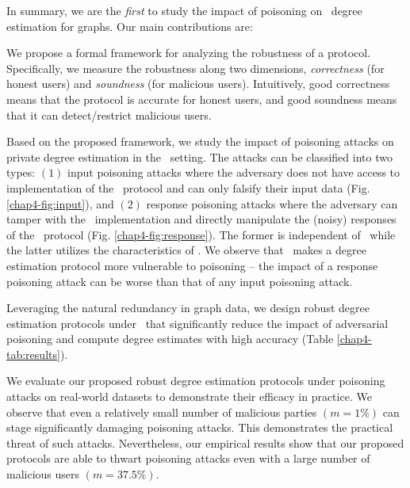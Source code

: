 In summary, we are the \textit{first} to study the impact of poisoning  on \ldp~degree estimation for graphs. Our main contributions are: 
\squishlist
    \item We propose a formal framework for analyzing the robustness of a protocol. %
Specifically, we measure the robustness along two dimensions, \textit{correctness} (for honest users) and \textit{soundness} (for malicious users). Intuitively, good correctness means that the protocol is accurate for honest users, and good soundness means that it can detect/restrict malicious users. %
\item Based on the proposed framework, we study the impact of poisoning attacks on private degree estimation in the \ldp~setting. The attacks can be classified into two types: $(1)$ input poisoning attacks  where the adversary does not have access to implementation of the \ldp~protocol and can only falsify their input data (Fig. \ref{chap4-fig:input}), and $(2)$ response poisoning attacks where the adversary can tamper with the \ldp~implementation and directly manipulate the (noisy) responses of the \ldp~protocol (Fig. \ref{chap4-fig:response}). The former is independent of \ldp~while the latter utilizes the characteristics of \ldp. We observe that \ldp~makes a degree estimation protocol more vulnerable to poisoning -- the impact of a response poisoning attack can be worse than that of any input poisoning attack. 
\item Leveraging the natural redundancy in graph data, we design robust degree estimation protocols under \ldp~that significantly reduce the impact of adversarial poisoning and compute degree estimates with high accuracy (Table \ref{chap4-tab:results}).
\item We evaluate our proposed robust degree estimation protocols under poisoning attacks on real-world datasets to demonstrate their efficacy in practice. We observe that even a relatively
small number of malicious parties $(m = 1\% )$ can stage significantly damaging poisoning attacks. This demonstrates the
practical threat of such attacks. Nevertheless, our empirical results show that our proposed protocols are
able to thwart poisoning attacks
even with a large number of malicious users $(m = 37.5\%)$.
\squishend



  


